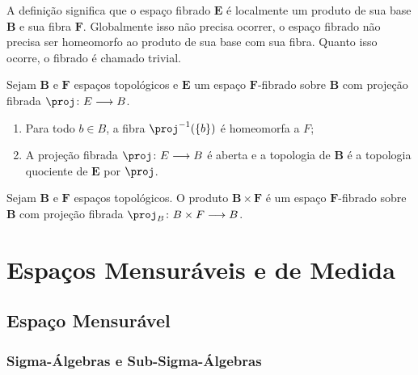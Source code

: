 A definição significa que o espaço fibrado $\bm E$ é localmente um produto de sua base $\bm B$ e sua fibra $\bm F$. Globalmente isso não precisa ocorrer, o espaço fibrado não precisa ser homeomorfo ao produto de sua base com sua fibra. Quanto isso ocorre, o fibrado é chamado trivial.

\begin{prop}
Sejam $\bm B$ e $\bm F$ espaços topológicos e $\bm E$ um espaço $\bm F$-fibrado sobre $\bm B$ com projeção fibrada $\proj\colon E \to B$.
	\begin{enumerate}
	\item Para todo $b \in B$, a fibra $\proj\inv(\{b\})$ é homeomorfa a $F$;
	\item A projeção fibrada $\proj\colon E \to B$ é aberta e a topologia de $\bm B$ é a topologia quociente de $\bm E$ por $\proj$.
	\end{enumerate}
\end{prop}

\begin{prop}
Sejam $\bm B$ e $\bm F$ espaços topológicos. O produto $\bm B \times \bm F$ é um espaço $\bm F$-fibrado sobre $\bm B$ com projeção fibrada $\proj_B\colon B \times F \to B$.
\end{prop}
































\chapter{Espaços Mensuráveis e de Medida}

\section{Espaço Mensurável}

\subsection{Sigma-Álgebras e Sub-Sigma-Álgebras}


